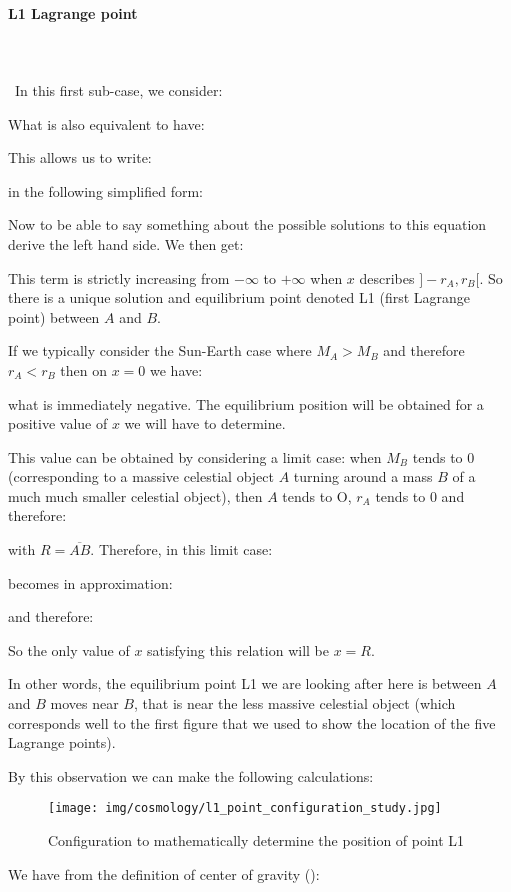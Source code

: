 	\paragraph{L1 Lagrange point}\mbox{}\\\\\
	In this first sub-case, we consider:
	
	What is also equivalent to have:
	
	This allows us to write:
	
	in the following simplified form:
	
	Now to be able to say something about the possible solutions to this equation derive the left hand side. We then get:
	
	This term is strictly increasing from $-\infty$ to $+\infty$ when $x$ describes $]-r_A,r_B[$. So there is a unique solution and equilibrium point denoted L1 (first Lagrange point) between $A$ and $B$.

	If we typically consider the Sun-Earth case where $M_A>M_B$ and therefore $r_A<r_B$ then on $x=0$ we have:
	
	what is immediately negative. The equilibrium position will be obtained for a positive value of $x$ we will have to determine.

	This value can be obtained by considering a limit case: when $M_B$ tends to $0$ (corresponding to a massive celestial object $A$ turning around a mass $B$ of a much much smaller celestial object), then $A$ tends to O, $r_A$ tends to $0$ and therefore:
	
	with $R=\overline{AB}$. Therefore, in this limit case:
	
	becomes in approximation:
	
	and therefore:
	
	So the only value of $x$ satisfying this relation will be $x=R$.

	In other words, the equilibrium point L1 we are looking after here is between $A$ and $B$ moves near $B$, that is near the less massive celestial object (which corresponds well to the first figure that we used to show the location of the five Lagrange points).

	By this observation we can make the following calculations: 
	\begin{figure}[H]
		\centering
		\texttt{[image: img/cosmology/l1\_point\_configuration\_study.jpg]}	
		\caption[]{Configuration to mathematically determine the position of point L1}
	\end{figure}
	We have from the definition of center of gravity ():
	
